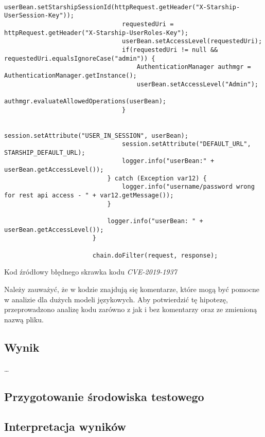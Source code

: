 \begin{listing}
\begin{verbatim}
                                userBean.setStarshipSessionId(httpRequest.getHeader("X-Starship-UserSession-Key"));
                                requestedUri = httpRequest.getHeader("X-Starship-UserRoles-Key");
                                userBean.setAccessLevel(requestedUri);
                                if(requestedUri != null && requestedUri.equalsIgnoreCase("admin")) {
                                    AuthenticationManager authmgr = AuthenticationManager.getInstance();
                                    userBean.setAccessLevel("Admin");
                                    authmgr.evaluateAllowedOperations(userBean);
                                }

                                session.setAttribute("USER_IN_SESSION", userBean);
                                session.setAttribute("DEFAULT_URL", STARSHIP_DEFAULT_URL);
                                logger.info("userBean:" + userBean.getAccessLevel());
                            } catch (Exception var12) {
                                logger.info("username/password wrong for rest api access - " + var12.getMessage());
                            }

                            logger.info("userBean: " + userBean.getAccessLevel());
                        }

                        chain.doFilter(request, response);
\end{verbatim}
\caption{Kod źródłowy błędnego skrawka kodu \textit{CVE-2019-1937}}
\label{lst:code1}
\end{listing}

\restoregeometry

Należy zauważyć, że w kodzie znajdują się komentarze, które mogą być pomocne w analizie dla dużych modeli językowych. 
Aby potwierdzić tę hipotezę, przeprowadzono analizę kodu zarówno z jak i bez komentarzy oraz ze zmienioną nazwą pliku.

\subsection{Wynik}
\dots

\subsection{Przygotowanie środowiska testowego}
\DOTSB

\subsection{Interpretacja wyników}
\label{subsec:interpretacja_wynikow}

